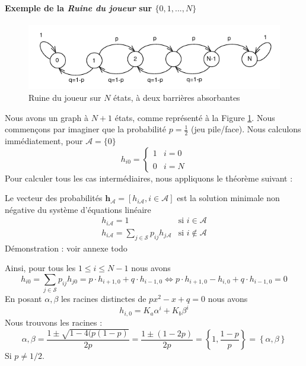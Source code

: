 \documentclass[11pt,a4paper]{article}
\numberwithin{equation}{section}
\begin{document}
\paragraph{Exemple de la \textit{Ruine du joueur} sur $\{0,1,...,N\}$}
\begin{figure}
    \centering
     \includegraphics[scale=0.5]{images/ruine_joueur}
     \caption{Ruine du joueur sur $N$ états, à deux barrières absorbantes}
     \label{fig:ruine_joueur}
\end{figure}
Nous avons un graph à $N+1$ états, comme représenté à la Figure \ref{fig:ruine_joueur}. Nous commençons par imaginer que la probabilité $p = \frac{1}{2}$ (jeu pile/face). Nous calculons immédiatement, pour $\mathcal{A} = \{0\}$
\[h_{i0} = \left\{\begin{array}{ll}
    1 & i=0\\
    \\
    0 & i=N
\end{array}\right.\]
Pour calculer tous les cas intermédiaires, nous appliquons le théorème suivant :
\begin{boite}
     Le vecteur des probabilités $\mathbf{h}_\mathcal{A} = [h_{i\mathcal{A}},i \in \mathcal{A}]$ est la solution minimale non négative du système d'équations linéaire
    \begin{equation}
        \begin{array}{ll}
        h_{i\mathcal{A}} = 1 & \text{si } i \in \mathcal{A}\\
        h_{i\mathcal{A}} = \sum_{j \in \mathcal{S}}p_{ij}h_{j\mathcal{A}} & \text{si } i \notin \mathcal{A}
    \end{array}
\end{equation}
Démonstration : voir annexe {todo}
\end{boite}

Ainsi, pour tous les $1 \leq i \leq N-1$ nous avons 
\[h_{i0} = \sum_{j \in \mathcal{S}} p_{ij} h_{j0} = p\cdot h_{i+1,0} + q \cdot h_{i-1,0} \iff p\cdot h_{i+1,0} - h_{i,0} + q\cdot h_{i-1,0} = 0\]
En posant $\alpha,\beta$ les racines distinctes de $px^2 - x + q = 0$ nous avons
\[h_{i,0} = K_a \alpha^i + K_b \beta^i\]
Nous trouvons les racines :
\[\alpha,\beta = \frac{1\pm \sqrt{1-4(p(1-p)}}{2p} = \frac{1 \pm (1-2p)}{2p} = \left\{1,\frac{1-p}{p}\right\} = \left\{\alpha,\beta\right\}\]
Si $p \neq 1/2$. 
\end{document}
